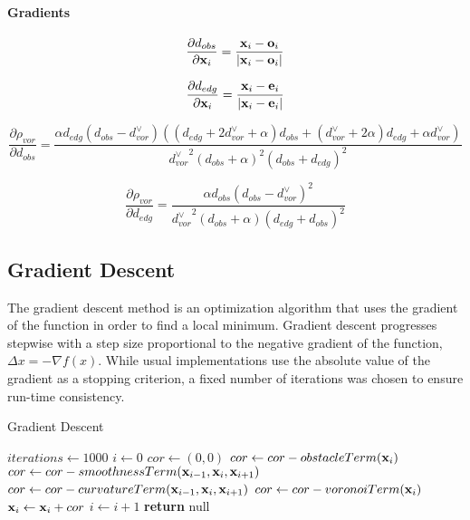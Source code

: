 \paragraph{Gradients}

\begin{equation}
\frac{\partial d_{obs}}{\partial \mathbf{x}_i} = \frac{\mathbf{x}_i-\mathbf{o}_i}{|\mathbf{x}_i-\mathbf{o}_i|}
\end{equation}

\begin{equation}
\frac{\partial d_{edg}}{\partial \mathbf{x}_i} =\frac{\mathbf{x}_i-\mathbf{e}_i}{|\mathbf{x}_i-\mathbf{e}_i|}
\end{equation}

\begin{equation}
\frac{\partial\rho_{vor}}{\partial d_{obs}} = \frac{\alpha d_{edg}\left(d_{obs}-d_{vor}^{\lor}\right)\left(\left(d_{edg}+2d_{vor}^{\lor}+\alpha\right) d_{obs}+\left(d_{vor}^{\lor}+2\alpha\right)d_{edg}+\alpha d_{vor}^{\lor}\right)}{{d_{vor}^{\lor}}^2\left(d_{obs}+\alpha\right)^2\left(d_{obs}+d_{edg}\right)^2}
\end{equation}

\begin{equation}
\frac{\partial\rho_{vor}}{\partial d_{edg}} =  \frac{\alpha d_{obs}\left(d_{obs}-d_{vor}^{\lor}\right)^2}{{d_{vor}^{\lor}}^2\left(d_{obs}+\alpha\right)\left(d_{edg}+d_{obs}\right)^2}
\end{equation}

\subsection{Gradient Descent}
The gradient descent method is an optimization algorithm that uses the gradient of the function in order to find a local minimum. Gradient descent progresses stepwise with a step size proportional to the negative gradient of the function, $\Delta x = - \nabla f(x)$. While usual implementations use the absolute value of the gradient as a stopping criterion, a fixed number of iterations was chosen to ensure run-time consistency. \cite{Boyd.2004}

\begin{algorithm}
    \caption{Gradient Descent}\label{alg:gradientDescent}
    \begin{algorithmic}[1]
    \State $iterations \gets 1000$
    \State $i \gets 0$
        	\ForAll {$\bldx \in \calP$}
        		\State $cor \gets  (0,0)$
        		\State $cor \gets  cor - obstacleTerm(\mathbf{x}_{i})$
        		\State $cor \gets  cor - smoothnessTerm(\mathbf{x}_{i-1},\mathbf{x}_{i},\mathbf{x}_{i+1})$
        		\State $cor \gets  cor - curvatureTerm(\mathbf{x}_{i-1},\mathbf{x}_{i},\mathbf{x}_{i+1})$
        		\State $cor \gets  cor - voronoiTerm(\mathbf{x}_{i})$
        		\State $\mathbf{x}_{i} \gets \mathbf{x}_{i} + cor$
        	\EndFor
        \State $i \gets i + 1$
        \EndWhile
        \State \textbf{return} null
    \end{algorithmic}
\end{algorithm}